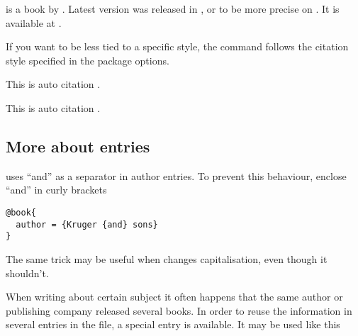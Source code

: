 \begin{example}[standalone,
  biber,
  biber_dir=../src/examples/,
  paperwidth=5cm,
  paperheight=4cm,
]
\usepackage{biblatex}

\sloppy

\noindent
 is a book by
\citeauthor{lshort}. Latest version was
released in \citeyear{lshort}, or to
be more precise on . It
is available at .

\end{example}

If you want to be less tied to a specific style, the 
command follows the citation style specified in the package options.

\begin{example}[standalone,
  biber,
  biber_dir=../src/examples/,
  paperwidth=5cm,
  paperheight=4cm,
]
\usepackage[
  style=verbose,
  autocite=footnote,
]{biblatex}



\sloppy

\noindent
This is auto citation \autocite{curie}.

\end{example}


\begin{example}[standalone,
  biber,
  biber_dir=../src/examples/,
  paperwidth=5cm,
  paperheight=2cm,
]
\usepackage[
  style=authoryear,
  autocite=inline,
]{biblatex}


\sloppy

\noindent
This is auto citation \autocite{curie}.

\end{example}

\subsection{More about entries}

 uses ``and'' as a separator in author entries. To prevent
this behaviour, enclose ``and'' in curly brackets
\begin{verbatim}
@book{
  author = {Kruger {and} sons}
}
\end{verbatim}
The same trick may be useful when  changes capitalisation, even
though it shouldn't.

When writing about certain subject it often happens that the same author or
publishing company released several books. In order to reuse the information in
several entries in the  file, a special entry  is available. It may be used
like this


